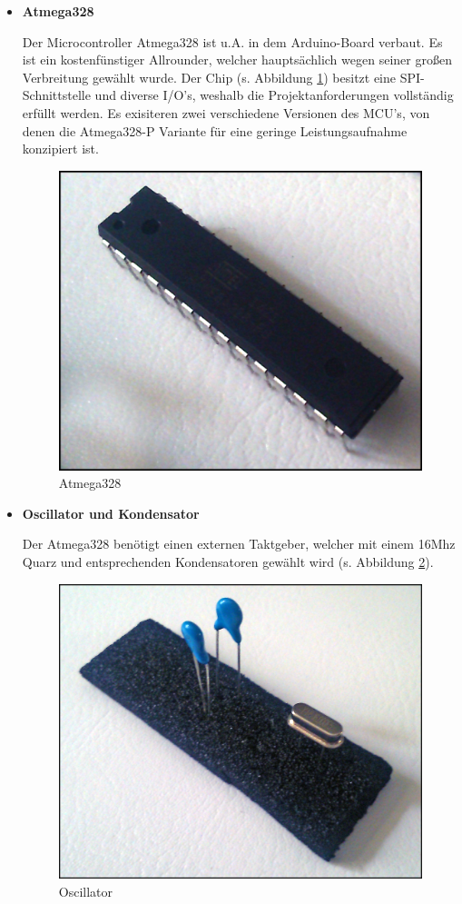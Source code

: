 \begin{itemize}
	\item \textbf{Atmega328}
	
	Der Microcontroller Atmega328 ist u.A. in dem Arduino-Board verbaut. Es ist ein kostenfünstiger Allrounder, welcher hauptsächlich wegen seiner großen Verbreitung gewählt wurde.
	Der Chip (s. Abbildung \ref{fig:Atmega328}) besitzt eine SPI-Schnittstelle und diverse I/O's, weshalb die Projektanforderungen vollständig erfüllt werden.
	\newline
	Es exisiteren zwei verschiedene Versionen des MCU's, von denen die Atmega328-P Variante für eine geringe Leistungsaufnahme konzipiert ist. 
	
	\begin{figure}[H]
		\centering
		\includegraphics[width=0.4\linewidth]{Bilder/Atmega328}
		\caption[Atmega328]{Atmega328}
		\label{fig:Atmega328}
	\end{figure}
	
	\item \textbf{Oscillator und Kondensator}
	
	Der Atmega328 benötigt einen externen Taktgeber, welcher mit einem 16Mhz Quarz und entsprechenden Kondensatoren gewählt wird (s. Abbildung \ref{fig:Oscillator}).
	
	\begin{figure}[H]
		\centering
		\includegraphics[width=0.4\linewidth]{Bilder/Oscillator}
		\caption[Oscillator]{Oscillator}
		\label{fig:Oscillator}
	\end{figure}
		
\end{itemize}